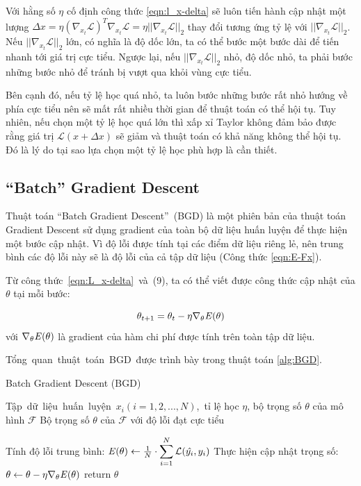 Với hằng số $\eta$ cố định công thức \ref{eqn:l_x-delta} sẽ luôn tiến hành cập nhật một lượng $\Delta x = \eta (\nabla _{x_t}\mathcal{L})^T\nabla _{x_t}\mathcal{L} = \eta ||\nabla _{x_t}\mathcal{L}||_2$ thay đổi tương ứng tỷ lệ với $||\nabla _{x_t} \mathcal{L}||_2$. Nếu $||\nabla _{x_t} \mathcal{L}||_2$ lớn, có nghĩa là độ dốc lớn, ta có thể bước một bước dài để tiến nhanh tới giá trị cực tiểu. Ngược lại, nếu $||\nabla_{x_t} \mathcal{L}||_2$ nhỏ, độ dốc nhỏ, ta phải bước những bước nhỏ để tránh bị vượt qua khỏi vùng cực tiểu.

Bên cạnh đó, nếu tỷ lệ học quá nhỏ, ta luôn bước những bước rất nhỏ hướng về phía cực tiểu nên sẽ mất rất nhiều thời gian để thuật toán có thể hội tụ. Tuy nhiên, nếu chọn một tỷ lệ học quá lớn thì xấp xỉ Taylor không đảm bảo được rằng giá trị $\mathcal{L}(x + \Delta x)$ sẽ giảm và thuật toán có khả năng không thể hội tụ. Đó là lý do tại sao lựa chọn một tỷ lệ học phù hợp là cần thiết.

\subsection{``Batch'' Gradient Descent}

Thuật toán ``Batch Gradient Descent'' (BGD) là một phiên bản của thuật toán Gradient Descent sử dụng gradient của toàn bộ dữ liệu huấn luyện để thực hiện một bước cập nhật. Vì độ lỗi được tính tại các điểm dữ liệu riêng lẻ, nên trung bình các độ lỗi này sẽ là độ lỗi của cả tập dữ liệu (Công thức \ref{eqn:E-Fx}).

Từ công thức \ref{eqn:L_x-delta} và (9), ta có thể viết được công thức cập nhật của $\theta$ tại mỗi bước:

\begin{equation}
\theta_{t+1} = \theta_ t - \eta \nabla_{\theta} \mathbf{\it{E}(\theta)}
\end{equation}
với $\nabla_\theta \mathbf{\it{E}(\theta)}$ là gradient của hàm chi phí được tính trên toàn tập dữ liệu.

Tổng quan thuật toán BGD được trình bày trong thuật toán \ref{alg:BGD}.

\begin{algorithm}
	\caption{Batch Gradient Descent (BGD)} \label{alg:BGD}
	\begin{algorithmic}[1]
		\renewcommand{\algorithmicrequire}{\textbf{Đầu vào:}}
		\renewcommand{\algorithmicensure}{\textbf{Đầu ra:}}
		\algnewcommand{}
		\algnewcommand\Operation{\item[\algorithmicoperation]}

		\Require Tập dữ liệu huấn luyện $x_i (i = 1, 2, ..., N)$, tỉ lệ học $\eta$, bộ trọng số $\theta$ của mô hình $\mathcal{F}$
		\Ensure Bộ trọng số $\theta$ của $\mathcal{F}$ với độ lỗi đạt cực tiểu

		\Operation
			\State Tính độ lỗi trung bình: $\mathbf{\it{E}(\theta)} \gets \frac{1}{N}\cdot \displaystyle\sum_{i=1}^{N}\mathcal{L}(\hat{y_i}, y_i)$
			\State Thực hiện cập nhật trọng số: $\theta \gets \theta - \eta \nabla_{\theta} \mathbf{\it{E}(\theta)}$
		\EndWhile
		\State return $\theta$
	\end{algorithmic}
\end{algorithm}


